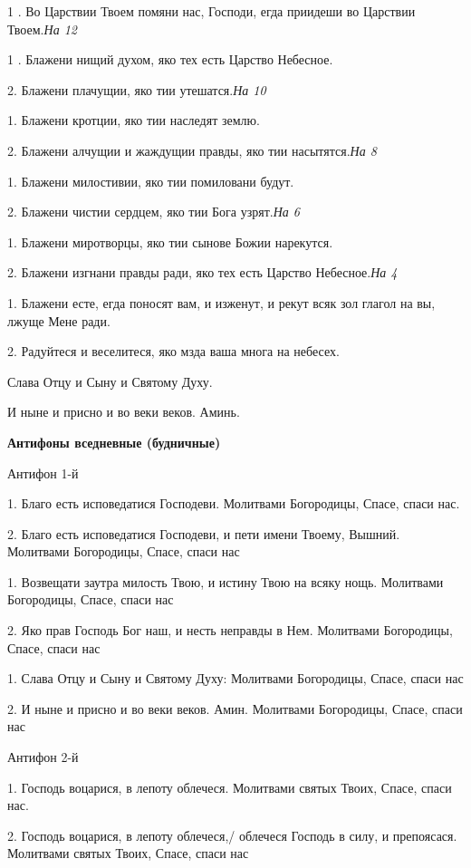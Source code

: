 1 . Во Царствии Твоем помяни нас, Господи, егда приидеши во Царствии Твоем.\itshape  На \normalfont{}12 


1 . Блажени нищий духом, яко тех есть Царство Небесное. 


2. Блажени плачущии, яко тии утешатся.\itshape  На \normalfont{}10 


1. Блажени кротции, яко тии наследят землю. 


2. Блажени алчущии и жаждущии правды, яко тии насытятся.\itshape  На\normalfont{} 8 


1. Блажени милостивии, яко тии помиловани будут. 


2. Блажени чистии сердцем, яко тии Бога узрят.\itshape  На\normalfont{} 6 


1. Блажени миротворцы, яко тии сынове Божии нарекутся. 


2. Блажени изгнани правды ради, яко тех есть Царство Небесное.\itshape  На\normalfont{} 4 


1. Блажени есте, егда поносят вам, и изженут, и рекут всяк зол глагол на вы, лжуще Мене ради. 


2. Радуйтеся и веселитеся, яко мзда ваша многа на небесех. 


Слава Отцу и Сыну и Святому Духу. 


И ныне и присно и во веки веков. Аминь. 


\medskip


\bfseries Антифоны вседневные (будничные) \normalfont{}


Антифон 1-й 


1. Благо есть исповедатися Господеви. Молитвами Богородицы, Спасе, спаси нас. 


2. Благо есть исповедатися Господеви, и пети имени Твоему, Вышний. Молитвами Богородицы, Спасе, спаси нас 


1. Возвещати заутра милость Твою, и истину Твою на всяку нощь. Молитвами Богородицы, Спасе, спаси нас 


2. Яко прав Господь Бог наш, и несть неправды в Нем. Молитвами Богородицы, Спасе, спаси нас


1. Слава Отцу и Сыну и Святому Духу: Молитвами Богородицы, Спасе, спаси нас 


2. И ныне и присно и во веки веков. Амин. Молитвами Богородицы, Спасе, спаси нас

Антифон 2-й 


1. Господь воцарися, в лепоту облечеся. Молитвами святых Твоих, Спасе, спаси нас. 


2. Господь воцарися, в лепоту облечеся,/ облечеся Господь в силу, и препоясася. Молитвами святых Твоих, Спасе, спаси нас 



